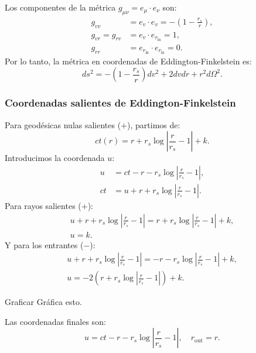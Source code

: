 Los componentes de la métrica \( g_{\mu\nu} = e_\mu \cdot e_\nu \) son:
\begin{equation}
    \begin{aligned}
        g_{vv}          & = e_v \cdot e_v = -\left(1 - \frac{r_s}{r}\right), \\
        g_{vr} = g_{rv} & = e_v \cdot e_{r_{\text{in}}} = 1,                 \\
        g_{rr}          & = e_{r_{\text{in}}} \cdot e_{r_{\text{in}}} = 0.
    \end{aligned}
\end{equation}
Por lo tanto, la métrica en coordenadas de Eddington-Finkelstein es:
\begin{equation}
    ds^2 = -\left(1 - \frac{r_s}{r}\right) dv^2 + 2 dv dr + r^2 d\Omega^2.
\end{equation}
\subsubsection{Coordenadas salientes de Eddington-Finkelstein}
Para geodésicas nulas salientes (\(+\)), partimos de:
\begin{equation}
    ct(r) = r + r_s \log \left| \frac{r}{r_s} - 1 \right| + k.
\end{equation}
Introducimos la coordenada \( u \):
\begin{equation}
    \begin{aligned}
        u  & = ct - r - r_s \log \left| \frac{r}{r_s} - 1 \right|, \\
        ct & = u + r + r_s \log \left| \frac{r}{r_s} - 1 \right|.
    \end{aligned}
\end{equation}
Para rayos salientes (\(+\)):
\begin{equation}
    \begin{aligned}
        u + r + r_s \log \left| \frac{r}{r_s} - 1 \right| = r + r_s \log \left| \frac{r}{r_s} - 1 \right| + k, \\
        u = k.
    \end{aligned}
\end{equation}
Y para los entrantes (\(-\)):
\begin{equation}
    \begin{aligned}
        u + r + r_s \log \left| \frac{r}{r_s} - 1 \right| = -r - r_s \log \left| \frac{r}{r_s} - 1 \right| + k, \\
        u = -2\left(r + r_s \log \left| \frac{r}{r_s} - 1 \right|  \right) +k.
    \end{aligned}
\end{equation}
\begin{task}{Graficar}{}
    Gráfica esto.
\end{task}
Las coordenadas finales son:
\begin{equation}
    \boxed{u = ct - r - r_s \log \left| \frac{r}{r_s} - 1 \right|, \quad r_{\text{out}} = r}.
\end{equation}

